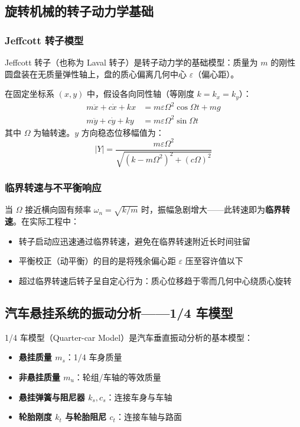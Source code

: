 \subsection{旋转机械的转子动力学基础}
\subsubsection{Jeffcott 转子模型}
Jeffcott 转子（也称为 Laval 转子）是转子动力学的基础模型：质量为 $m$ 的刚性圆盘装在无质量弹性轴上，盘的质心偏离几何中心 $\varepsilon$（偏心距）。

\begin{myformula}
在固定坐标系 $(x, y)$ 中，假设各向同性轴（等刚度 $k = k_x = k_y$）：
\begin{align}
m\ddot{x} + c\dot{x} + kx &= m\varepsilon\Omega^{2}\cos\Omega t + mg \\
m\ddot{y} + c\dot{y} + ky &= m\varepsilon\Omega^{2}\sin\Omega t
\end{align}
其中 $\Omega$ 为轴转速。$y$ 方向稳态位移幅值为：
$$|Y| = \frac{m\varepsilon\Omega^{2}}{\sqrt{(k - m\Omega^{2})^{2} + (c\Omega)^{2}}}$$
\end{myformula}

\subsubsection{临界转速与不平衡响应}
当 $\Omega$ 接近横向固有频率 $\omega_n = \sqrt{k/m}$ 时，振幅急剧增大——此转速即为\textbf{临界转速}。在实际工程中：
\begin{itemize}
    \item 转子启动应迅速通过临界转速，避免在临界转速附近长时间驻留
    \item 平衡校正（动平衡）的目的是将残余偏心距 $\varepsilon$ 压至容许值以下
    \item 超过临界转速后转子呈自定心行为：质心位移趋于零而几何中心绕质心旋转
\end{itemize}

\subsection{汽车悬挂系统的振动分析——1/4 车模型}
1/4 车模型（Quarter-car Model）是汽车垂直振动分析的基本模型：
\begin{itemize}
    \item \textbf{悬挂质量 $m_s$}：1/4 车身质量
    \item \textbf{非悬挂质量 $m_u$}：轮组/车轴的等效质量
    \item \textbf{悬挂弹簧与阻尼器 $k_s, c_s$}：连接车身与车轴
    \item \textbf{轮胎刚度 $k_t$ 与轮胎阻尼 $c_t$}：连接车轴与路面
\end{itemize}

